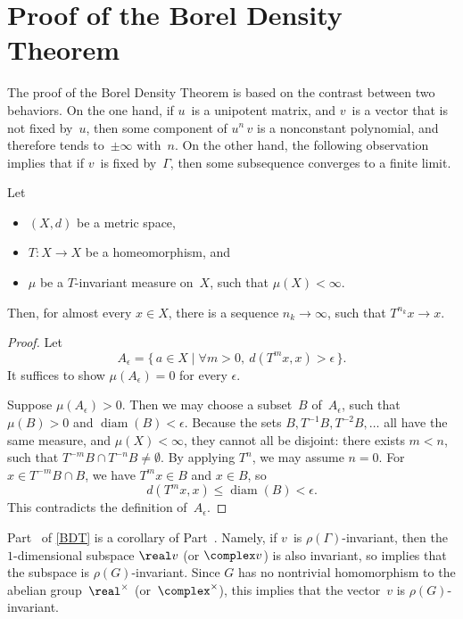 \section{Proof of the Borel Density Theorem}
\label{BDTPfSect}

The proof of the Borel Density Theorem  is based on the contrast between two behaviors. On the one hand, if $u$~is a unipotent matrix, and $v$~is a vector that is not fixed by~$u$, then some component of $u^n \, v$ is a nonconstant polynomial, and therefore tends to~$\pm\infty$ with~$n$. 
On the other hand, the following observation implies that if $v$~is fixed by~$\Gamma$, then some subsequence converges to a finite limit.

\begin{lem}
\label{PoincareRecurThm}
 Let
 \begin{itemize}
 \item $(X,d)$ be a metric space,
 \item $T \colon X \to X$ be a homeomorphism, and
 \item $\mu$ be a $T$-invariant measure on~$X$, such that $\mu(X) < \infty$.
 \end{itemize}
 Then, for almost every $x \in X$, there is a
sequence $n_k \to \infty$, such that $T^{n_k} x \to x$.
 \end{lem}

\begin{proof}
 Let
 $$ A_\epsilon = \{\, a \in X \mid \forall m>0, \
d(T^m x, x) > \epsilon \,\}.$$
 It suffices to show $\mu(A_\epsilon) = 0$ for every
$\epsilon$.

Suppose $\mu(A_{\epsilon}) > 0$. Then we may choose a
subset~$B$ of~$A_\epsilon$, such that $\mu(B) > 0$ and
$\operatorname{diam}(B) < \epsilon$. Because the sets $B,
T^{-1}B, T^{-2} B, \ldots$ all have the same measure, and
$\mu(X) < \infty$, they cannot all be disjoint:
there exists $m < n$, such that $T^{-m} B \cap T^{-n} B
\neq \emptyset$. By applying $T^{n}$, we may assume $n =
0$. For $x \in T^{-m} B \cap B$, we have $T^m x \in B$ and
$x \in B$, so 
 $$d(T^m x, x) \le \operatorname{diam}(B) < \epsilon .$$
 This contradicts the definition of~$A_\epsilon$.
 \end{proof}
 
 \begin{rem}
Part~ of \cref{BDT} is a corollary of Part~. Namely, if $v$~is $\rho(\Gamma)$-invariant, then the $1$-dimensional subspace $\real v$ (or $\complex v$) is also invariant, so  implies that the subspace is $\rho(G)$-invariant. Since $G$ has no nontrivial homomorphism to the abelian group~$\real^\times$ (or~$\complex^\times$), this implies that the vector~$v$ is $\rho(G)$-invariant. 
\end{rem}

